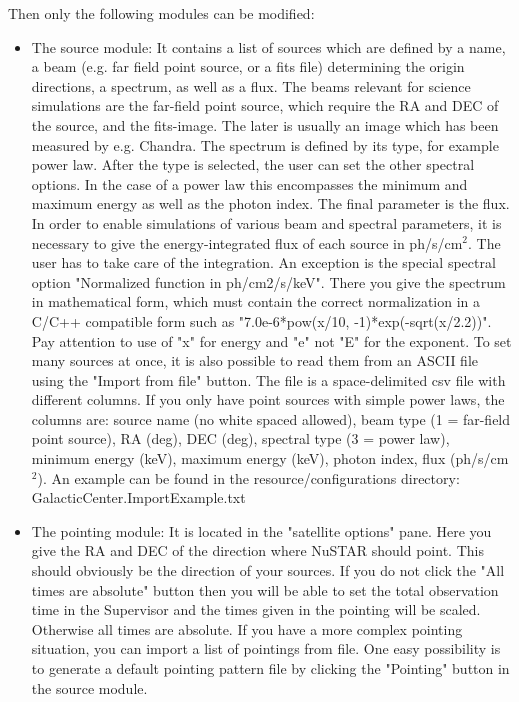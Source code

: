 Then only the following modules can be modified:
\begin{itemize}
\item The source module: 
It contains a list of sources which are defined by a name, a beam (e.g. far field point source, or a fits file) determining the origin directions, a spectrum, as well as a flux.
The beams relevant for science simulations are the far-field point source, which require the RA and DEC of the source, and the fits-image. The later is usually an image which has been measured by e.g. Chandra.
The spectrum is defined by its type, for example power law. 
After the type is selected, the user can set the other spectral options.
In the case of a power law this encompasses the minimum and maximum energy as well as the photon index.
The final parameter is the flux.
In order to enable simulations of various beam and spectral parameters, it is necessary to give the energy-integrated flux of each source in ph/s/cm$^2$. 
The user has to take care of the integration.
An exception is the special spectral option "Normalized function in ph/cm2/s/keV". 
There you give the spectrum in mathematical form, which must contain the correct normalization in a C/C++ compatible form such as "7.0e-6*pow(x/10, -1)*exp(-sqrt(x/2.2))".
Pay attention to use of "x" for energy and "e" not "E" for the exponent.
To set many sources at once, it is also possible to read them from an ASCII file using the "Import from file" button. 
The file is a space-delimited csv file with different columns. If you only have point sources with simple power laws, the columns are: source name (no white spaced allowed), beam type (1 = far-field point source), RA (deg), DEC (deg), spectral type (3 = power law), minimum energy (keV), maximum energy (keV), photon index, flux (ph/s/cm$^2$).
An example can be found in the resource/configurations directory: GalacticCenter.ImportExample.txt
\item The pointing module: 
It is located in the "satellite options" pane. 
Here you give the RA and DEC of the direction where NuSTAR should point. 
This should obviously be the direction of your sources.
If you do not click the "All times are absolute" button then you will be able to set the total observation time in the Supervisor and the times given in the pointing will be scaled.
Otherwise all times are absolute. 
If you have a more complex pointing situation, you can import a list of pointings from file.
One easy possibility is to generate a default pointing pattern file by clicking the "Pointing" button in the source module. 

\end{itemize}
